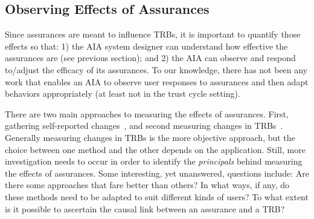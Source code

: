 \subsection{Observing Effects of Assurances} \label{sec:measuring_effects}
    Since assurances are meant to influence TRBs, it is important to quantify those effects so that:  1) the AIA system designer can understand how effective the assurances are (see previous section); and 2) the AIA can observe and respond to/adjust the efficacy of its assurances. To our knowledge, there has not been any work that enables an AIA to observe user responses to assurances and then adapt behaviors appropriately (at least not in the trust cycle setting). 

    There are two main approaches to measuring the effects of assurances. First, gathering self-reported changes~\cite{Mcknight2011-gv,Muir1996-gt,Wickens1999-la,Salem2015-md,Kaniarasu2013-ho}, and second measuring changes in TRBs~\cite{Freedy2007-sg,Desai2012-rc,Salem2015-md,Wu2016-ei,Bainbridge2011-pl}. Generally measuring changes in TRBs is the more objective approach, but the choice between one method and the other depends on the application. Still, more investigation needs to occur in order to identify the \emph{principals} behind measuring the effects of assurances. Some interesting, yet unanswered, questions include: Are there some approaches that fare better than others? In what ways, if any, do these methods need to be adapted to suit different kinds of users? To what extent is it possible to ascertain the causal link between an assurance and a TRB?
